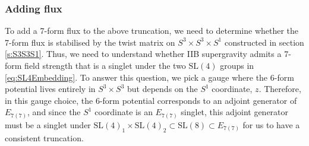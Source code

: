 \documentclass[a4paper, 11pt]{article}
\numberwithin{equation}{section}
\newcommand{\SL}[1]{\mathrm{SL}( #1 )}
\newcommand{\En}[1]{E_{#1(#1)}}
\newcommand{\+}{\oplus}
\begin{document}
\subsubsection{Adding flux} \label{s:AddFluxS3S3S1}
To add a 7-form flux to the above truncation, we need to determine whether the 7-form flux is stabilised by the twist matrix on $S^3 \times S^3 \times S^1$ constructed in section \ref{s:S3S3S1}. Thus, we need to understand 
whether IIB supergravity admits a 7-form field strength that is a singlet under the two $\SL{4}$ groups in \eqref{eq:SL4Embedding}. To answer this question, we pick a gauge where the 6-form potential lives entirely in $S^3 \times S^3$ but depends on the $S^1$ coordinate, $z$. Therefore, in this gauge choice, the 6-form potential corresponds to an adjoint generator of $\En{7}$, and since the $S^1$ coordinate is an $\En{7}$ singlet, this adjoint generator must be a singlet under $\SL{4}_1 \times \SL{4}_2 \subset \SL{8} \subset \En{7}$ for us to have a consistent truncation.
\end{document}
